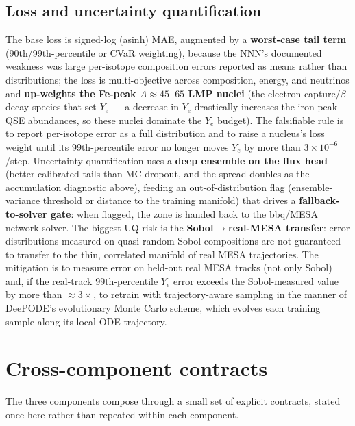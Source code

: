 \documentclass[11pt]{article}
\newcommand{\Ye}{Y_{e}}
\begin{document}
\subsection{Loss and uncertainty quantification}

The base loss is signed-log (asinh) MAE, augmented by a \textbf{worst-case tail term} (90th/99th-percentile or CVaR weighting), because the NNN's documented weakness was large per-isotope composition errors reported as means rather than distributions; the loss is multi-objective across composition, energy, and neutrinos and \textbf{up-weights the Fe-peak $A \approx 45$--$65$ LMP nuclei} (the electron-capture/$\beta$-decay species that set $\Ye$ --- a decrease in $\Ye$ drastically increases the iron-peak QSE abundances, so these nuclei dominate the $\Ye$ budget). The falsifiable rule is to report per-isotope error as a full distribution and to raise a nucleus's loss weight until its 99th-percentile error no longer moves $\Ye$ by more than $3\times10^{-6}$/step. Uncertainty quantification uses a \textbf{deep ensemble on the flux head} (better-calibrated tails than MC-dropout, and the spread doubles as the accumulation diagnostic above), feeding an out-of-distribution flag (ensemble-variance threshold or distance to the training manifold) that drives a \textbf{fallback-to-solver gate}: when flagged, the zone is handed back to the bbq/MESA network solver. The biggest UQ risk is the \textbf{Sobol$\to$real-MESA transfer}: error distributions measured on quasi-random Sobol compositions are not guaranteed to transfer to the thin, correlated manifold of real MESA trajectories. The mitigation is to measure error on held-out real MESA tracks (not only Sobol) and, if the real-track 99th-percentile $\Ye$ error exceeds the Sobol-measured value by more than $\approx 3\times$, to retrain with trajectory-aware sampling in the manner of DeePODE's evolutionary Monte Carlo scheme, which evolves each training sample along its local ODE trajectory.

\section{Cross-component contracts}

The three components compose through a small set of explicit contracts, stated once here rather than repeated within each component.
\end{document}
